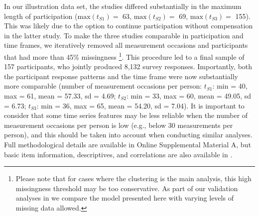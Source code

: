 In our illustration data set, the studies differed substantially in the
maximum length of participation (\(\text{max}(t_{S1})=\) 63,
\(\text{max}(t_{S2})=\) 69, \(\text{max}(t_{S3})=\) 155). This was
likely due to the option to continue participation without compensation
in the latter study. To make the three studies comparable in
participation and time frames, we iteratively removed all measurement
occasions and participants that had more than 45\% missingness
\citep[which was in line with the general recommendation for data that might still need to rely on imputations for later model testing; see][]{Madley-Dowd2019}\footnote{Please note that for cases where the clustering is the main analysis, this high missingness threshold may be too conservative. As part of our validation analyses in  we compare the model presented here with varying levels of missing data allowed.}.
This procedure led to a final sample of 157 participants, who jointly
produced 8,132 survey responses. Importantly, both the participant
response patterns and the time frame were now substantially more
comparable (number of measurement occasions per person: \(t_{S1}\): min
= 40, max = 61, mean = 57.33, sd = 4.69; \(t_{S2}\): min = 33, max = 60,
mean = 49.05, sd = 6.73; \(t_{S3}\): min = 36, max = 65, mean = 54.20,
sd = 7.04). It is important to consider that some time series features
may be less reliable when the number of measurement occasions per person
is low (e.g., below 30 measurements per person), and this should be
taken into account when conducting similar analyses. Full methodological
details are available in Online Supplemental Material A, but basic item
information, descriptives, and correlations are also available in
.


